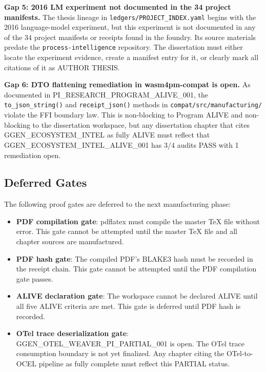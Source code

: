 \textbf{Gap 5: 2016 LM experiment not documented in the 34 project manifests.}
The thesis lineage in \texttt{ledgers/PROJECT\_INDEX.yaml} begins with the 2016
language-model experiment, but this experiment is not documented in any of the 34 project
manifests or receipts found in the foundry. Its source materials predate the
\texttt{process-intelligence} repository. The dissertation must either locate the experiment
evidence, create a manifest entry for it, or clearly mark all citations of it as AUTHOR
THESIS.

\textbf{Gap 6: DTO flattening remediation in wasm4pm-compat is open.}
As documented in PI\_RESEARCH\_PROGRAM\_ALIVE\_001, the \texttt{to\_json\_string()} and
\texttt{receipt\_json()} methods in \texttt{compat/src/manufacturing/} violate the FFI
boundary law. This is non-blocking to Program ALIVE and non-blocking to the dissertation
workspace, but any dissertation chapter that cites GGEN\_ECOSYSTEM\_INTEL as fully ALIVE
must reflect that GGEN\_ECOSYSTEM\_INTEL\_ALIVE\_001 has 3/4 audits PASS with 1
remediation open.

\subsection{Deferred Gates}
\label{sec:phd-thesis-open-deferred}

The following proof gates are deferred to the next manufacturing phase:

\begin{itemize}
  \item \textbf{PDF compilation gate}: pdflatex must compile the master TeX file without
    error. This gate cannot be attempted until the master TeX file and all chapter sources
    are manufactured.
  \item \textbf{PDF hash gate}: The compiled PDF's BLAKE3 hash must be recorded in the
    receipt chain. This gate cannot be attempted until the PDF compilation gate passes.
  \item \textbf{ALIVE declaration gate}: The workspace cannot be declared ALIVE until
    all five ALIVE criteria are met. This gate is deferred until PDF hash is recorded.
  \item \textbf{OTel trace deserialization gate}:
    GGEN\_OTEL\_WEAVER\_PI\_PARTIAL\_001 is open. The OTel trace consumption boundary
    is not yet finalized. Any chapter citing the OTel-to-OCEL pipeline as fully complete
    must reflect this PARTIAL status.
\end{itemize}

